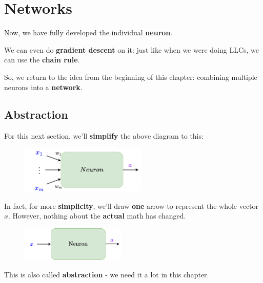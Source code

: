 \pagebreak
    
\section{Networks}

    Now, we have fully developed the individual \textbf{neuron}. 
    
    We can even do \textbf{gradient descent} on it: just like when we were doing LLCs, we can use the \textbf{chain rule}. 
        
    So, we return to the idea from the beginning of this chapter: combining multiple neurons into a \textbf{network}. 
    
    \subsection{Abstraction}
        For this next section, we'll \textbf{simplify} the above diagram to this:
        
        \begin{figure}[H]
            \centering
            \includegraphics[width=60mm,scale=0.4]{images/nn_images/neuron_abstraction.png}
        \end{figure}
        
        In fact, for more \textbf{simplicity}, we'll draw \textbf{one} arrow to represent the whole vector $x$. However, nothing about the \textbf{actual} math has changed.
        
        \begin{figure}[H]
            \centering
            \includegraphics[width=50mm,scale=0.4]{images/nn_images/neuron_abstraction_x.png}
        \end{figure}
        
        This is also called \textbf{abstraction} - we need it a lot in this chapter.\\
        
